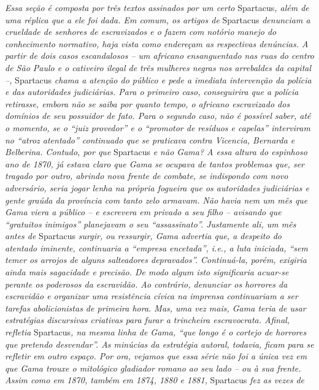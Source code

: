 {\begin{argumento}
\emph{Essa seção é composta por três textos assinados por um certo}
Spartacus\emph{, além de uma réplica que a ele foi dada. Em comum, os
artigos de} Spartacus \emph{denunciam a crueldade de senhores de
escravizados e o fazem com notório manejo do conhecimento normativo,
haja vista como endereçam as respectivas denúncias. A partir de dois
casos escandalosos -- um africano ensanguentado nas ruas do centro de
São Paulo e o cativeiro ilegal de três mulheres negras nos arrebaldes da
capital --,} Spartacus \emph{chama a atenção do público e pede a
imediata intervenção da polícia e das autoridades judiciárias. Para o
primeiro caso, conseguirira que a polícia retirasse, embora não se saiba
por quanto tempo, o africano escravizado dos domínios de seu possuidor
de fato. Para o segundo caso, não é possível saber, até o momento, se o
``juiz provedor'' e o ``promotor de resíduos e capelas'' interviram no
``atroz atentado'' continuado que se praticava contra Vicencia, Bernarda e
Belberina. Contudo, por que} Spartacus \emph{e não Gama? A essa altura
do espinhoso ano de 1870, já estava claro que Gama se ocupava de tantos
problemas que, ser tragado por outro, abrindo nova frente de combate, se
indispondo com novo adversário, seria jogar lenha na própria fogueira
que os autoridades judiciárias e gente graúda da província com tanto
zelo armavam. Não havia nem um mês que Gama viera a público -- e
escrevera em privado a seu filho -- avisando que ``gratuitos inimigos''
planejavam o seu ``assassinato''. Justamente ali, um mês antes de}
Spartacus \emph{surgir, ou ressurgir, Gama advertia que, a despeito do
atentado iminente, continuaria a ``empresa encetada'', i.e., a luta
iniciada, ``sem temer os arrojos de alguns salteadores depravados''.
Continuá-la, porém, exigiria ainda mais sagacidade e precisão. De modo
algum isto significaria acuar-se perante os poderosos da escravidão. Ao
contrário, denunciar os horrores da escravidão e organizar uma
resistência cívica na imprensa continuariam a ser tarefas abolicionistas
de primeira hora. Mas, uma vez mais, Gama teria de usar estratégias
discursivas criativas para furar a trincheira escravocrata. Afinal,
refletia} Spartacus\emph{, na mesma linha de Gama, ``que longo é o
cortejo de horrores que pretendo desvendar''. As minúcias da estratégia
autoral, todavia, ficam para se refletir em outro espaço. Por ora,
vejamos que essa série não foi a única vez em que Gama trouxe o
mitológico gladiador romano ao seu lado -- ou à sua frente. Assim como
em 1870, também em 1874, 1880 e 1881,} Spartacus \emph{fez as vezes de
}
\end{argumento}}

